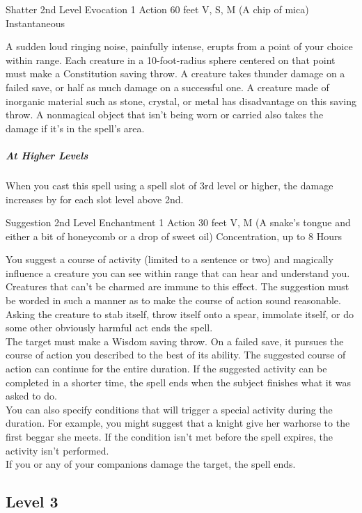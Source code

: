 \documentclass[letterpaper,openany,oneside,twocolumn]{book}
\begin{document}
\DndSpellHeader
  {Shatter}
  {2nd Level Evocation}
  {1 Action}
  {60 feet}
  {V, S, M (A chip of mica)}
  {Instantaneous}

A sudden loud ringing noise, painfully intense, erupts from a point of your choice within range. Each creature in a 10-foot-radius sphere centered on that point must make a Constitution saving throw. A creature takes  thunder damage on a failed save, or half as much damage on a successful one. A creature made of inorganic material such as stone, crystal, or metal has disadvantage on this saving throw. A nonmagical object that isn't being worn or carried also takes the damage if it's in the spell's area.

\subparagraph*{At Higher Levels} When you cast this spell using a spell slot of 3rd level or higher, the damage increases by  for each slot level above 2nd.

\DndSpellHeader
  {Suggestion}
  {2nd Level Enchantment}
  {1 Action}
  {30 feet}
  {V, M (A snake's tongue and either a bit of honeycomb or a drop of sweet oil)}
  {Concentration, up to 8 Hours}

You suggest a course of activity (limited to a sentence or two) and magically influence a creature you can see within range that can hear and understand you. Creatures that can't be charmed are immune to this effect. The suggestion must be worded in such a manner as to make the course of action sound reasonable. Asking the creature to stab itself, throw itself onto a spear, immolate itself, or do some other obviously harmful act ends the spell.\\
The target must make a Wisdom saving throw. On a failed save, it pursues the course of action you described to the best of its ability. The suggested course of action can continue for the entire duration. If the suggested activity can be completed in a shorter time, the spell ends when the subject finishes what it was asked to do.\\
You can also specify conditions that will trigger a special activity during the duration. For example, you might suggest that a knight give her warhorse to the first beggar she meets. If the condition isn't met before the spell expires, the activity isn't performed.\\
If you or any of your companions damage the target, the spell ends.

\subsection*{Level 3}
\end{document}
